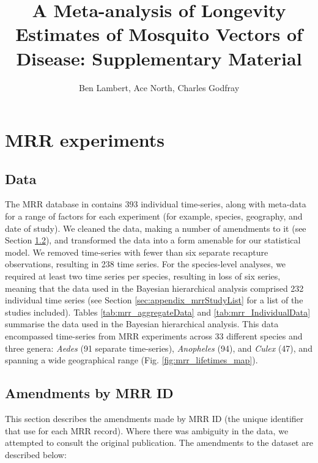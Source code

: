 \documentclass[12pt]{article}
\title{A Meta-analysis of Longevity Estimates of Mosquito Vectors of Disease: Supplementary Material}
\author{Ben Lambert, Ace North, Charles Godfray}
\begin{document}
\maketitle

\section{MRR experiments}
\subsection{Data}
The MRR database in \cite{guerra2014global} contains 393 individual time-series, along with meta-data for a range of factors for each experiment (for example, species, geography, and date of study). We  cleaned the data, making a number of amendments to it (see Section \ref{sec:amendments}), and transformed the data into a form amenable for our statistical model. We removed time-series with fewer than six separate recapture observations, resulting in 238 time series. For the species-level analyses, we required at least two time series per species, resulting in loss of six series, meaning that the data used in the Bayesian hierarchical analysis comprised 232 individual time series (see Section \ref{sec:appendix_mrrStudyList} for a list of the studies included). Tables \ref{tab:mrr_aggregateData} and \ref{tab:mrr_IndividualData} summarise the data used in the Bayesian hierarchical analysis. This data encompassed time-series from MRR experiments across 33 different species and three genera: \textit{Aedes} (91 separate time-series), \textit{Anopheles} (94), and \textit{Culex} (47), and spanning a wide geographical range (Fig. \ref{fig:mrr_lifetimes_map}).

\subsection{Amendments by MRR ID}\label{sec:amendments}
This section describes the amendments made by MRR ID (the unique identifier that \cite{guerra2014global} use for each MRR record). Where there was ambiguity in the data, we attempted to consult the original publication. The amendments to the dataset are described below:
\end{document}
